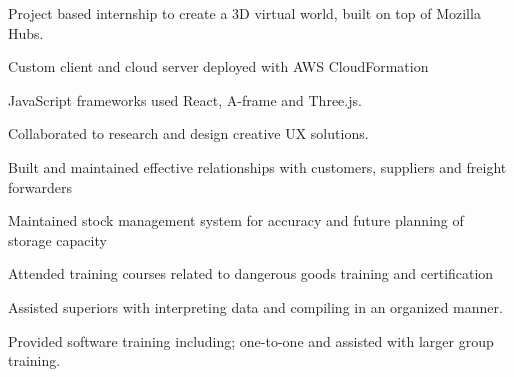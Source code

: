 \documentclass[]{deedy-resume-openfont}
\begin{document}
\begin{minipage}[t]{4in}
\begin{tightemize}
\item Project based internship to create a 3D virtual world, built on top of Mozilla Hubs.
\item Custom client and cloud server deployed with AWS CloudFormation
\item JavaScript frameworks used React, A-frame and Three.js. 
\item Collaborated to research and design creative UX solutions.

\end{tightemize}
\sectionsep

\begin{tightemize}
\item Built and maintained effective relationships with customers, suppliers and freight forwarders
\item Maintained stock management system for accuracy and future planning of storage capacity
\item Attended training courses related to dangerous goods training and certification
\end{tightemize}
\sectionsep

\vspace{\topsep} %
\begin{tightemize}
\item Assisted superiors with interpreting data and compiling in an organized manner.
\item Provided software training including; one-to-one and assisted with larger group training.
\end{tightemize}
\sectionsep

\end{minipage} 
\end{document}
